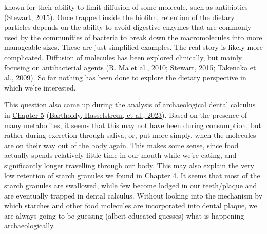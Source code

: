 \documentclass[
  letterpaper,
]{book}
\begin{document}
known for their ability to limit diffusion of some molecule, such as
antibiotics
(\protect\hyperlink{ref-stewartAntimicrobialTolerance2015}{Stewart,
2015}). Once trapped inside the biofilm, retention of the dietary
particles depends on the ability to avoid digestive enzymes that are
commonly used by the communities of bacteria to break down the
macromolecules into more manageable sizes. These are just simplified
examples. The real story is likely more complicated. Diffusion of
molecules has been explored clinically, but mainly focusing on
antibacterial agents (\protect\hyperlink{ref-maModelingDiffusion2010}{R.
Ma et al., 2010};
\protect\hyperlink{ref-stewartAntimicrobialTolerance2015}{Stewart,
2015};
\protect\hyperlink{ref-takenakaDiffusionMacromolecules2009}{Takenaka et
al., 2009}). So far nothing has been done to explore the dietary
perspective in which we're interested.

This question also came up during the analysis of archaeological dental
calculus in \protect\hyperlink{mb11CalculusPilot}{Chapter 5}
(\protect\hyperlink{ref-bartholdyMultiproxyAnalysis2023}{Bartholdy,
Hasselstrøm, et al., 2023}). Based on the presence of many metabolites,
it seems that this may not have been during consumption, but rather
during excretion through saliva, or, put more simply, when the molecules
are on their way out of the body again. This makes some sense, since
food actually spends relatively little time in our mouth while we're
eating, and significantly longer travelling through our body. This may
also explain the very low retention of starch granules we found in
\protect\hyperlink{byoc-starch}{Chapter 4}. It seems that most of the
starch granules are swallowed, while few become lodged in our
teeth/plaque and are eventually trapped in dental calculus. Without
looking into the mechanism by which starches and other food molecules
are incorporated into dental plaque, we are always going to be guessing
(albeit educated guesses) what is happening archaeologically.
\end{document}
